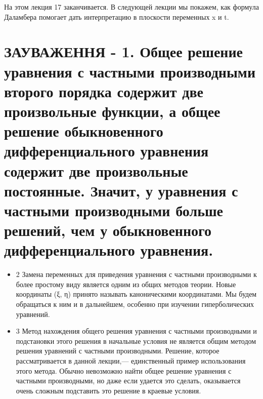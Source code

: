 \documentclass[
  ukrainian,
]{article}
\begin{document}
На этом лекция 17 заканчивается. В следующей лекции мы покажем, как
формула Даламбера помогает дать интерпретацию в плоскости переменных x и
t.

\section{ЗАУВАЖЕННЯ - 1. Общее решение уравнения с частными производными
второго порядка содержит две произвольные функции, а общее решение
обыкновенного дифференциального уравнения содержит две произвольные
постоянные. Значит, у уравнения с частными производными больше решений,
чем у обыкновенного дифференциального
уравнения.}\label{ux437ux430ux443ux432ux430ux436ux435ux43dux43dux44f---1.-ux43eux431ux449ux435ux435-ux440ux435ux448ux435ux43dux438ux435-ux443ux440ux430ux432ux43dux435ux43dux438ux44f-ux441-ux447ux430ux441ux442ux43dux44bux43cux438-ux43fux440ux43eux438ux437ux432ux43eux434ux43dux44bux43cux438-ux432ux442ux43eux440ux43eux433ux43e-ux43fux43eux440ux44fux434ux43aux430-ux441ux43eux434ux435ux440ux436ux438ux442-ux434ux432ux435-ux43fux440ux43eux438ux437ux432ux43eux43bux44cux43dux44bux435-ux444ux443ux43dux43aux446ux438ux438-ux430-ux43eux431ux449ux435ux435-ux440ux435ux448ux435ux43dux438ux435-ux43eux431ux44bux43aux43dux43eux432ux435ux43dux43dux43eux433ux43e-ux434ux438ux444ux444ux435ux440ux435ux43dux446ux438ux430ux43bux44cux43dux43eux433ux43e-ux443ux440ux430ux432ux43dux435ux43dux438ux44f-ux441ux43eux434ux435ux440ux436ux438ux442-ux434ux432ux435-ux43fux440ux43eux438ux437ux432ux43eux43bux44cux43dux44bux435-ux43fux43eux441ux442ux43eux44fux43dux43dux44bux435.-ux437ux43dux430ux447ux438ux442-ux443-ux443ux440ux430ux432ux43dux435ux43dux438ux44f-ux441-ux447ux430ux441ux442ux43dux44bux43cux438-ux43fux440ux43eux438ux437ux432ux43eux434ux43dux44bux43cux438-ux431ux43eux43bux44cux448ux435-ux440ux435ux448ux435ux43dux438ux439-ux447ux435ux43c-ux443-ux43eux431ux44bux43aux43dux43eux432ux435ux43dux43dux43eux433ux43e-ux434ux438ux444ux444ux435ux440ux435ux43dux446ux438ux430ux43bux44cux43dux43eux433ux43e-ux443ux440ux430ux432ux43dux435ux43dux438ux44f.}

\begin{itemize}
\item
  2 Замена переменных для приведения уравнения с частными производными к
  более простому виду является одним из общих методов теории. Новые
  координаты (ξ, η) принято называть каноническими координатами. Мы
  будем обращаться к ним и в дальнейшем, особенно при изучении
  гиперболических уравнений.
\item
  3 Метод нахождения общего решения уравнения с частными производными и
  подстановки этого решения в начальные условия не является общим
  методом решения уравнений с частными производными. Решение, которое
  рассматривается в данной лекции,--- единственный пример использования
  этого метода. Обычно невозможно найти общее решение уравнения с
  частными производными, но даже если удается это сделать, оказывается
  очень сложным подставить это решение в краевые условия.
\end{itemize}
\end{document}
